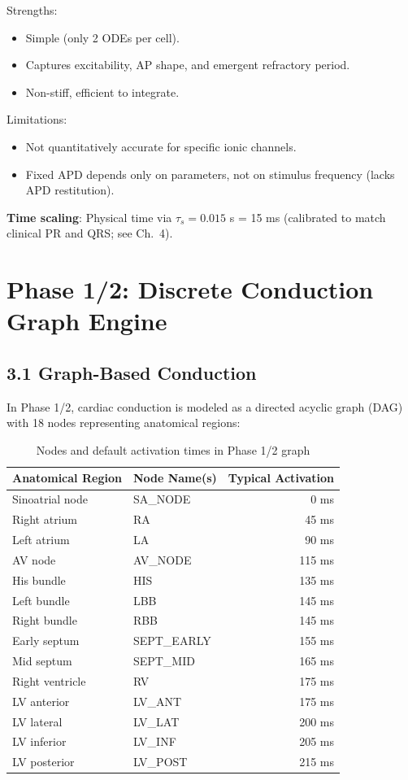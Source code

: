 \documentclass[12pt,oneside,a4paper]{book}
\begin{document}
Strengths:
\begin{itemize}
  \item Simple (only 2 ODEs per cell).
  \item Captures excitability, AP shape, and emergent refractory period.
  \item Non-stiff, efficient to integrate.
\end{itemize}

Limitations:
\begin{itemize}
  \item Not quantitatively accurate for specific ionic channels.
  \item Fixed APD depends only on parameters, not on stimulus frequency (lacks APD restitution).
\end{itemize}

\textbf{Time scaling}: Physical time via $\tau_s = 0.015$ s = 15 ms (calibrated to match clinical PR and QRS; see Ch.~4).

\chapter{Phase 1/2: Discrete Conduction Graph Engine}

\section{3.1 Graph-Based Conduction}

In Phase 1/2, cardiac conduction is modeled as a directed acyclic graph (DAG) with 18 nodes representing anatomical regions:

\begin{table}[H]
\centering
\begin{tabularx}{\textwidth}{|l|X|r|}
\hline
\textbf{Anatomical Region} & \textbf{Node Name(s)} & \textbf{Typical Activation} \\
\hline
Sinoatrial node & SA\_NODE & 0 ms \\
Right atrium & RA & 45 ms \\
Left atrium & LA & 90 ms \\
AV node & AV\_NODE & 115 ms \\
His bundle & HIS & 135 ms \\
Left bundle & LBB & 145 ms \\
Right bundle & RBB & 145 ms \\
Early septum & SEPT\_EARLY & 155 ms \\
Mid septum & SEPT\_MID & 165 ms \\
Right ventricle & RV & 175 ms \\
LV anterior & LV\_ANT & 175 ms \\
LV lateral & LV\_LAT & 200 ms \\
LV inferior & LV\_INF & 205 ms \\
LV posterior & LV\_POST & 215 ms \\
\hline
\end{tabularx}
\caption{Nodes and default activation times in Phase 1/2 graph}
\label{tab:phase12_nodes}
\end{table}
\end{document}
